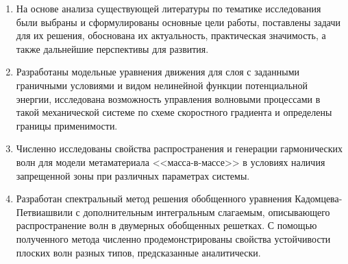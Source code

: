 


\begin{enumerate}
  \item На основе анализа существующей литературы по тематике исследования были выбраны и сформулированы основные цели работы, поставлены задачи для их решения, обоснована их актуальность, практическая значимость, а также дальнейшие перспективы для развития.
  \item Разработаны модельные уравнения движения для слоя с заданными граничными условиями и видом нелинейной функции потенциальной энергии, исследована возможность управления волновыми процессами в такой механической системе по схеме скоростного градиента и определены границы применимости.   
  \item Численно исследованы свойства распространения и генерации гармонических волн для модели метаматериала <<масса-в-массе>> в условиях наличия запрещенной зоны при различных параметрах системы.  
  \item Разработан спектральный метод решения обобщенного уравнения Кадомцева-Петвиашвили с дополнительным интегральным слагаемым, описывающего распространение волн в двумерных обобщенных решетках. С помощью полученного метода численно продемонстрированы свойства устойчивости плоских волн разных типов, предсказанные аналитически. 
\end{enumerate}

